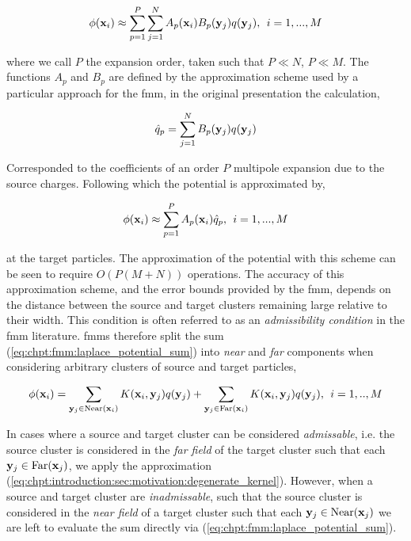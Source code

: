\begin{equation}
    \phi(\mathbf{x}_i) \approx \sum_{p=1}^P \sum_{j=1}^N A_p(\mathbf{x}_i) B_p(\mathbf{y}_j)q(\mathbf{y}_j), \> \> i = 1,...,M
    \label{eq:chpt:introduction:sec:motivation:degenerate_kernel}
\end{equation}

where we call $P$ the expansion order, taken such that $P \ll N$, $P \ll M$. The functions $A_p$ and $B_p$ are defined by the approximation scheme used by a particular approach for the \acrshort{fmm}, in the original presentation the calculation,

\begin{equation}
    \hat{q}_p = \sum_{j=1}^N B_p(\mathbf{y}_j)q(\mathbf{y}_j)
\end{equation}

Corresponded to the coefficients of an order $P$ multipole expansion due to the source charges. Following which the potential is approximated by,

\begin{equation}
    \phi(\mathbf{x}_i) \approx \sum_{p=1}^P A_p(\mathbf{x}_i)\hat{q}_p, \> \> i = 1,...,M
\end{equation}

at the target particles. The approximation of the potential with this scheme can be seen to require $O(P(M+N))$ operations. The accuracy of this approximation scheme, and the error bounds provided by the \acrshort{fmm}, depends on the distance between the source and target clusters remaining large relative to their width. This condition is often referred to as an \textit{admissibility condition} in the \acrshort{fmm} literature. \acrshort{fmm}s therefore split the sum (\ref{eq:chpt:fmm:laplace_potential_sum}) into \textit{near} and \textit{far} components when considering arbitrary clusters of source and target particles,

\begin{equation}
    \phi(\mathbf{x}_i) = \sum_{\mathbf{y}_j \in \text{Near}(\mathbf{x}_i)} K(\mathbf{x}_i, \mathbf{y}_j) q(\mathbf{y}_j) +  \sum_{\mathbf{y}_j \in \text{Far}(\mathbf{x}_i)} K(\mathbf{x}_i, \mathbf{y}_j) q(\mathbf{y}_j), \> \> i=1,..,M
\end{equation}

In cases where a source and target cluster can be considered \textit{admissable}, i.e. the source cluster is considered in the \textit{far field} of the target cluster such that each $\mathbf{y}_j \in \text{Far}(\mathbf{x}_j)$, we apply the approximation (\ref{eq:chpt:introduction:sec:motivation:degenerate_kernel}). However, when a source and target cluster are \textit{inadmissable}, such that the source cluster is considered in the \textit{near field} of a target cluster such that each $\mathbf{y}_j \in \text{Near}(\mathbf{x}_j)$ we are left to evaluate the sum directly via (\ref{eq:chpt:fmm:laplace_potential_sum}).

